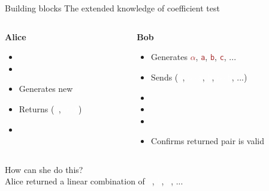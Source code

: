 \documentclass[dvipsnames]{beamer}
\newcommand{\priv}[1]{\textcolor{brown}{\texttt{#1}}}
\newcommand{\enc}[1]{\colorbox{SkyBlue!75}{\textcolor{white}{\texttt{#1}}}}
\begin{document}
    \begin{frame}{Building blocks}
        The extended knowledge of coefficient test
        \vspace{0.5cm}

        \begin{columns}
            \begin{column}{0.4\textwidth}
                \textbf{Alice}
                \begin{itemize}
                    \item[]
                    \item[]
                    \item Generates new \enc{X}
                    \item Returns (\enc{X}, \enc{$\alpha \cdot$X})
                    \item[]
                \end{itemize}
            \end{column}
            \begin{column}{0.6\textwidth}
                \textbf{Bob}
                \begin{itemize}
                    \item Generates \priv{$\alpha$}, \priv{a}, \priv{b}, \priv{c}, ...
                    \item Sends (\enc{a}, \enc{$\alpha \cdot$a}, \enc{b}, \enc{$\alpha \cdot$b}, ...)
                    \item[]
                    \item[]
                    \item[] \item Confirms returned pair is valid
                \end{itemize}
            \end{column}
        \end{columns}
        \begin{center}
            How can she do this?\\
            \pause
            Alice returned a linear combination of \enc{a}, \enc{b}, \enc{c}, ...
        \end{center}
    \end{frame}
\end{document}
